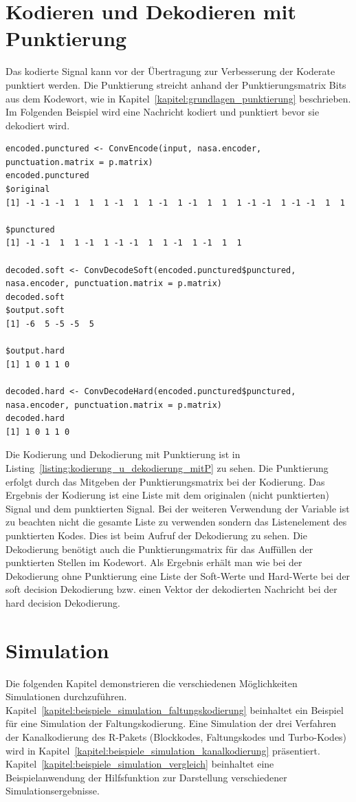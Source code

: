 \section{Kodieren und Dekodieren mit Punktierung}
\label{kapitel:beispiele_kodieren_mitP}
Das kodierte Signal kann vor der Übertragung zur Verbesserung der Koderate punktiert werden. Die Punktierung streicht anhand der Punktierungsmatrix Bits aus dem Kodewort, wie in Kapitel~\ref{kapitel:grundlagen_punktierung} beschrieben. Im Folgenden Beispiel wird eine Nachricht kodiert und punktiert bevor sie dekodiert wird.
\begin{lstlisting}[caption=Kodierung und Dekodierung mit Punktierung, label={listing:kodierung_u_dekodierung_mitP}, float=!th]
encoded.punctured <- ConvEncode(input, nasa.encoder, punctuation.matrix = p.matrix)
encoded.punctured
$original
[1] -1 -1 -1  1  1  1 -1  1  1 -1  1 -1  1  1  1 -1 -1  1 -1 -1  1  1

$punctured
[1] -1 -1  1  1 -1  1 -1 -1  1  1 -1  1 -1  1  1

decoded.soft <- ConvDecodeSoft(encoded.punctured$punctured, nasa.encoder, punctuation.matrix = p.matrix)
decoded.soft
$output.soft
[1] -6  5 -5 -5  5

$output.hard
[1] 1 0 1 1 0

decoded.hard <- ConvDecodeHard(encoded.punctured$punctured, nasa.encoder, punctuation.matrix = p.matrix)
decoded.hard
[1] 1 0 1 1 0
\end{lstlisting}
Die Kodierung und Dekodierung mit Punktierung ist in Listing~\ref{listing:kodierung_u_dekodierung_mitP} zu sehen. Die Punktierung erfolgt durch das Mitgeben der Punktierungsmatrix bei der Kodierung. Das Ergebnis der Kodierung ist eine Liste mit dem originalen (nicht punktierten) Signal und dem punktierten Signal. Bei der weiteren Verwendung der Variable ist zu beachten nicht die gesamte Liste zu verwenden sondern das Listenelement des punktierten Kodes. Dies ist beim Aufruf der Dekodierung zu sehen. Die Dekodierung benötigt auch die Punktierungsmatrix für das Auffüllen der punktierten Stellen im Kodewort. Als Ergebnis erhält man wie bei der Dekodierung ohne Punktierung eine Liste der Soft-Werte und Hard-Werte bei der soft decision Dekodierung bzw. einen Vektor der dekodierten Nachricht bei der hard decision Dekodierung.

\section{Simulation}
\label{kapitel:beispiele_simulation}
Die folgenden Kapitel demonstrieren die verschiedenen Möglichkeiten Simulationen durchzuführen. Kapitel~\ref{kapitel:beispiele_simulation_faltungskodierung} beinhaltet ein Beispiel für eine Simulation der Faltungskodierung. Eine Simulation der drei Verfahren der Kanalkodierung des R-Pakets (Blockkodes, Faltungskodes und Turbo-Kodes) wird in Kapitel~\ref{kapitel:beispiele_simulation_kanalkodierung} präsentiert. Kapitel~\ref{kapitel:beispiele_simulation_vergleich} beinhaltet eine Beispielanwendung der Hilfsfunktion zur Darstellung verschiedener Simulationsergebnisse.

